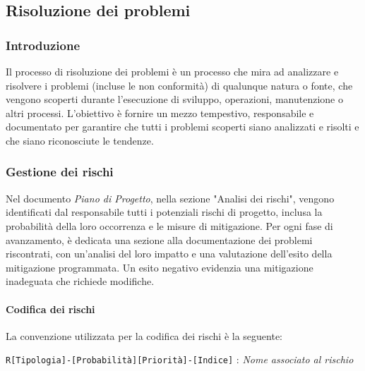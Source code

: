 \subsection{Risoluzione dei problemi}

\subsubsection{Introduzione} 
Il processo di risoluzione dei problemi è un processo che mira ad analizzare e risolvere i problemi (incluse le non conformità) di qualunque natura o fonte, che vengono scoperti durante l'esecuzione di sviluppo, operazioni, manutenzione o altri processi.
L'obiettivo è fornire un mezzo tempestivo, responsabile e documentato per garantire che tutti i problemi scoperti siano analizzati e risolti e che siano riconosciute le tendenze.

\subsubsection{Gestione dei rischi}
Nel documento \textit{Piano di Progetto}, nella sezione "Analisi dei rischi", vengono identificati dal responsabile tutti i potenziali rischi di progetto, inclusa la probabilità della loro occorrenza e le misure di mitigazione. Per ogni fase di avanzamento, è dedicata una sezione alla documentazione dei problemi riscontrati, con un'analisi del loro impatto e una valutazione dell'esito della mitigazione programmata. Un esito negativo evidenzia una mitigazione inadeguata che richiede modifiche.

\paragraph{Codifica dei rischi}
La convenzione utilizzata per la codifica dei rischi è la seguente: 
\begin{center}
    \texttt{R[Tipologia]-[Probabilità][Priorità]-[Indice]} : \textit{Nome associato al rischio}
\end{center} 

